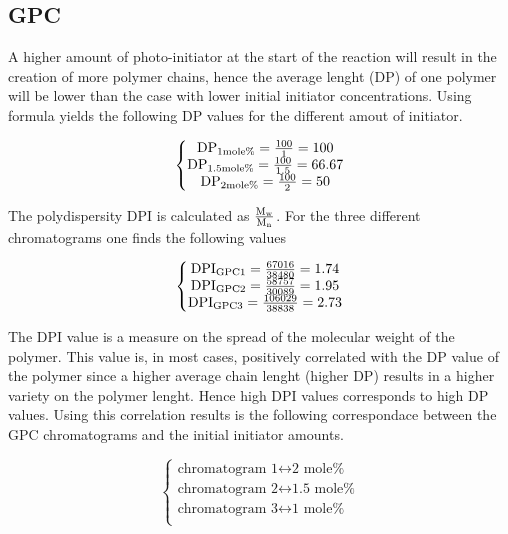 \subsection{GPC}

    A higher amount of photo-initiator at the start of the reaction will result in 
    the creation of more polymer chains, hence the average lenght (DP) of one polymer 
    will be lower than the case with lower initial initiator concentrations. Using formula 
     yields the following DP values for the different amout of initiator.

    $$\left\{\begin{matrix}
        \mathtext[1mole\%]{DP} = \frac{100}{1} = 100 \\
        \mathtext[1.5mole\%]{DP} = \frac{100}{1.5} = 66.67 \\
        \mathtext[2mole\%]{DP} = \frac{100}{2} = 50 \\
    \end{matrix}\right.$$

    The polydispersity DPI is calculated as $\frac{\mathtext[w]{M}}{\mathtext[n]{M}}$. For the 
    three different chromatograms one finds the following values

    $$\left\{\begin{matrix}
        \mathtext[GPC1]{DPI} = \frac{67016}{38480} = 1.74\\
        \mathtext[GPC2]{DPI} = \frac{58757}{30089} = 1.95\\
        \mathtext[GPC3]{DPI} = \frac{106029}{38838} = 2.73\\
    \end{matrix}\right.$$

    The DPI value is a measure on the spread of the molecular weight of the polymer. This value is, in most cases, 
    positively correlated with the DP value of the polymer since a higher average chain lenght (higher DP) results 
    in a higher variety on the polymer lenght. Hence high DPI values corresponds to high DP values. Using this correlation 
    results is the following correspondace between the GPC chromatograms and the initial initiator amounts.

    $$\left\{\begin{matrix}
        \text{chromatogram 1} \longleftrightarrow \text{2 mole\%}\\
        \text{chromatogram 2} \longleftrightarrow \text{1.5 mole\%}\\
        \text{chromatogram 3} \longleftrightarrow \text{1 mole\%}\\
    \end{matrix}\right.$$